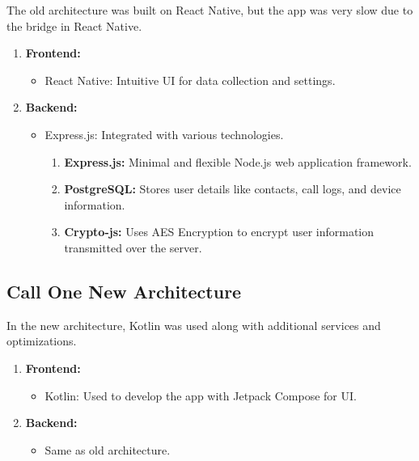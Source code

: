The old architecture was built on React Native, but the app was very slow due to the bridge in React Native.
\begin{enumerate}[label=\roman*.]
    \item \textbf{Frontend:}
    \begin{itemize}
        \item React Native: Intuitive UI for data collection and settings.
    \end{itemize}

    \item \textbf{Backend:}
    \begin{itemize}
        \item Express.js: Integrated with various technologies.
        \begin{enumerate}[label=\arabic*.]
            \item \textbf{Express.js:} Minimal and flexible Node.js web application framework.
            \item \textbf{PostgreSQL:} Stores user details like contacts, call logs, and device information.
            \item \textbf{Crypto-js:} Uses AES Encryption to encrypt user information transmitted over the server.
        \end{enumerate}
    \end{itemize}
\end{enumerate}

\subsection{Call One New Architecture}\label{subsec:new-architecture}
In the new architecture, Kotlin was used along with additional services and optimizations.
\begin{enumerate}[label=\roman*.]
    \item \textbf{Frontend:}
    \begin{itemize}
        \item Kotlin: Used to develop the app with Jetpack Compose for UI\@.
    \end{itemize}

    \item \textbf{Backend:}
    \begin{itemize}
        \item Same as old architecture.
    \end{itemize}
\end{enumerate}

